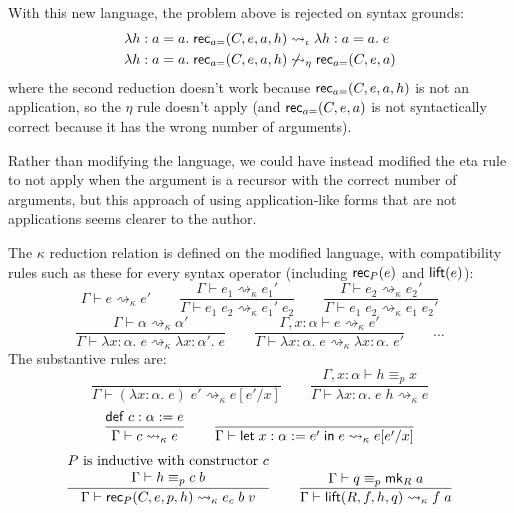 With this new language, the problem above is rejected on syntax grounds:
\begin{align*}
&\lambda h:a=a.\;\mathsf{rec}_{a=}(C,e,a,h)\rightsquigarrow_\iota\lambda h:a=a.\;e\\
&\lambda h:a=a.\;\mathsf{rec}_{a=}(C,e,a,h)\not\rightsquigarrow_\eta\mathsf{rec}_{a=}(C,e,a)
\end{align*}
where the second reduction doesn't work because $\mathsf{rec}_{a=}(C,e,a,h)$ is not an application, so the $\eta$ rule doesn't apply (and $\mathsf{rec}_{a=}(C,e,a)$ is not syntactically correct because it has the wrong number of arguments).

\begin{remark}
Rather than modifying the language, we could have instead modified the eta rule to not apply when the argument is a recursor with the correct number of arguments, but this approach of using application-like forms that are not applications seems clearer to the author.
\end{remark}

The $\kappa$ reduction relation is defined on the modified language, with compatibility rules such as these for every syntax operator (including $\mathsf{rec}_P(e)$ and $\mathsf{lift}(e)$):
$$\boxed{\Gamma\vdash e\rightsquigarrow_\kappa e'}\qquad
\frac{\Gamma\vdash e_1 \rightsquigarrow_\kappa e_1'}{\Gamma\vdash e_1\;e_2\rightsquigarrow_\kappa e_1'\;e_2}\qquad
\frac{\Gamma\vdash e_2 \rightsquigarrow_\kappa e_2'}{\Gamma\vdash e_1\;e_2\rightsquigarrow_\kappa e_1\;e_2'}$$
$$\frac{\Gamma\vdash \alpha \rightsquigarrow_\kappa\alpha'}{\Gamma\vdash \lambda x:\alpha.\;e\rightsquigarrow_\kappa \lambda x:\alpha'.\;e}\qquad
\frac{\Gamma,x:\alpha\vdash e \rightsquigarrow_\kappa e'}{\Gamma\vdash \lambda x:\alpha.\;e\rightsquigarrow_\kappa \lambda x:\alpha.\;e'}\qquad\dots$$
The substantive rules are:
$$\frac{}{\Gamma\vdash (\lambda x:\alpha.\;e)\;e'\rightsquigarrow_\kappa e[e'/x]}\qquad
\frac{\Gamma,x:\alpha\vdash h\equiv_p x}{\Gamma\vdash \lambda x:\alpha.\;e\;h\rightsquigarrow_\kappa e}$$
$$\frac{\mathsf{def}\;c:\alpha:=e}{\Gamma\vdash c\rightsquigarrow_\kappa e}\qquad
\frac{}{\Gamma\vdash \elet{x:\alpha:=e'}{e}\rightsquigarrow_\kappa e[e'/x]}$$
$$\frac{\begin{matrix}
P\mbox{ is inductive with constructor }c\\
\Gamma\vdash h\equiv_pc\;b
\end{matrix}}{\Gamma\vdash \rec_P(C,e,p,h)\rightsquigarrow_\kappa e_c\;b\;v}\qquad
\frac{\Gamma\vdash q\equiv_p \mk_R\;a}{\Gamma\vdash \lift(R,f,h,q)\rightsquigarrow_\kappa f\;a}$$

